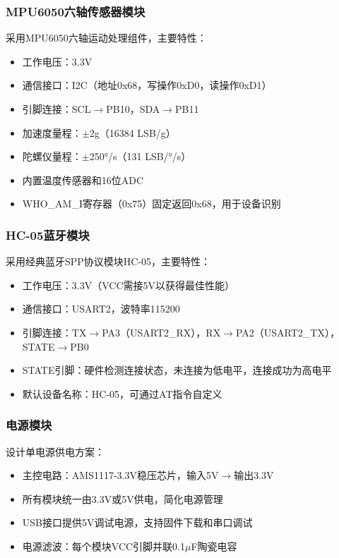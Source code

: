 \subsubsection{MPU6050六轴传感器模块}
采用MPU6050六轴运动处理组件，主要特性：
\begin{itemize}
    \item 工作电压：3.3V
    \item 通信接口：I2C（地址0x68，写操作0xD0，读操作0xD1）
    \item 引脚连接：SCL$\rightarrow$PB10，SDA$\rightarrow$PB11
    \item 加速度量程：$\pm$2g（16384 LSB/g）
    \item 陀螺仪量程：$\pm$250°/s（131 LSB/°/s）
    \item 内置温度传感器和16位ADC
    \item WHO\_AM\_I寄存器（0x75）固定返回0x68，用于设备识别
\end{itemize}

\subsubsection{HC-05蓝牙模块}
采用经典蓝牙SPP协议模块HC-05，主要特性：
\begin{itemize}
    \item 工作电压：3.3V（VCC需接5V以获得最佳性能）
    \item 通信接口：USART2，波特率115200
    \item 引脚连接：TX$\rightarrow$PA3（USART2\_RX），RX$\rightarrow$PA2（USART2\_TX），STATE$\rightarrow$PB0
    \item STATE引脚：硬件检测连接状态，未连接为低电平，连接成功为高电平
    \item 默认设备名称：HC-05，可通过AT指令自定义
\end{itemize}

\subsubsection{电源模块}
设计单电源供电方案：
\begin{itemize}
    \item 主控电路：AMS1117-3.3V稳压芯片，输入5V$\rightarrow$输出3.3V
    \item 所有模块统一由3.3V或5V供电，简化电源管理
    \item USB接口提供5V调试电源，支持固件下载和串口调试
    \item 电源滤波：每个模块VCC引脚并联0.1$\mu$F陶瓷电容
\end{itemize}

